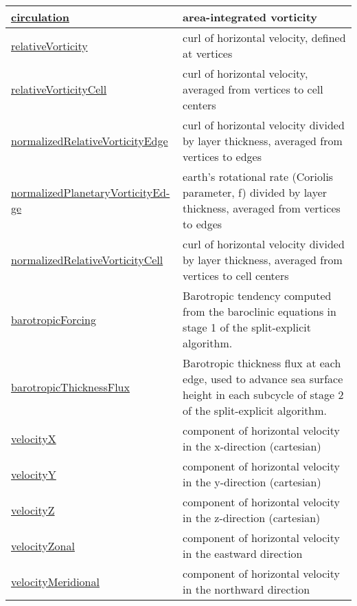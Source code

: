 {\begin{center}
\begin{longtable}{| p{2.0in} | p{4.0in} |}
	\hline
	\hyperref[subsec:var_sec_diagnostics_circulation]{circulation} & area-integrated vorticity \\
	\hline
	\hyperref[subsec:var_sec_diagnostics_relativeVorticity]{relativeVorticity} & curl of horizontal velocity, defined at vertices \\
	\hline
	\hyperref[subsec:var_sec_diagnostics_relativeVorticityCell]{relativeVorticityCell} & curl of horizontal velocity, averaged from vertices to cell centers \\
	\hline
	\hyperref[subsec:var_sec_diagnostics_normalizedRelativeVorticityEdge]{normalizedRelativeVorticityEdge} & curl of horizontal velocity divided by layer thickness, averaged from vertices to edges \\
	\hline
	\hyperref[subsec:var_sec_diagnostics_normalizedPlanetaryVorticityEdge]{normalizedPlanetaryVorticityEd-}\hyperref[subsec:var_sec_diagnostics_normalizedPlanetaryVorticityEdge]{ge  }& earth's rotational rate (Coriolis parameter, f) divided by layer thickness, averaged from vertices to edges \\
	\hline
	\hyperref[subsec:var_sec_diagnostics_normalizedRelativeVorticityCell]{normalizedRelativeVorticityCell} & curl of horizontal velocity divided by layer thickness, averaged from vertices to cell centers \\
	\hline
	\hyperref[subsec:var_sec_diagnostics_barotropicForcing]{barotropicForcing} & Barotropic tendency computed from the baroclinic equations in stage 1 of the split-explicit algorithm. \\
	\hline
	\hyperref[subsec:var_sec_diagnostics_barotropicThicknessFlux]{barotropicThicknessFlux} & Barotropic thickness flux at each edge, used to advance sea surface height in each subcycle of stage 2 of the split-explicit algorithm. \\
	\hline
	\hyperref[subsec:var_sec_diagnostics_velocityX]{velocityX} & component of horizontal velocity in the x-direction (cartesian) \\
	\hline
	\hyperref[subsec:var_sec_diagnostics_velocityY]{velocityY} & component of horizontal velocity in the y-direction (cartesian) \\
	\hline
	\hyperref[subsec:var_sec_diagnostics_velocityZ]{velocityZ} & component of horizontal velocity in the z-direction (cartesian) \\
	\hline
	\hyperref[subsec:var_sec_diagnostics_velocityZonal]{velocityZonal} & component of horizontal velocity in the eastward direction \\
	\hline
	\hyperref[subsec:var_sec_diagnostics_velocityMeridional]{velocityMeridional} & component of horizontal velocity in the northward direction \\

\end{longtable}
\end{center}}
